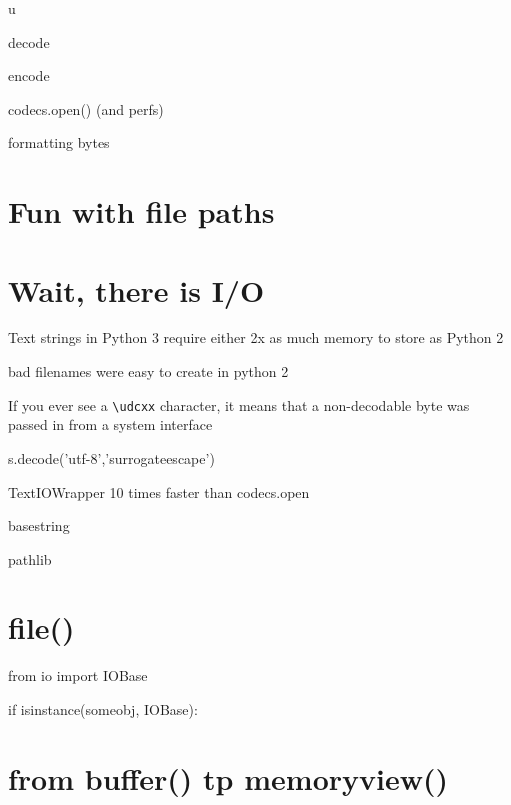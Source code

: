 

u

decode

encode

codecs.open() (and perfs)

formatting bytes

\section{Fun with file paths}

\section{Wait, there is I/O}


Text strings in Python 3 require either 2x as much memory to store as Python 2


bad filenames were easy to create in python 2

If you ever see a \lstinline{\udcxx} character, it means that a non-decodable byte was passed in from a system interface

s.decode('utf-8','surrogateescape')

TextIOWrapper 10 times faster than codecs.open

basestring



pathlib


\section{file()}

\begin{py2}
from io import IOBase

if isinstance(someobj, IOBase):
\end{py2}

\section{from buffer() tp memoryview()}

